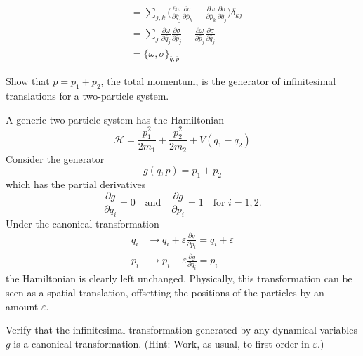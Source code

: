 \documentclass[../principles-of-quantum-mechanics.tex]{subfiles}
\begin{document}
\begin{questions}
\begin{solution}
\begin{align*}
				&= \sum_{j, k}\Big(\frac{\partial\omega}{\partial \bar{q}_j}\frac{\partial\sigma}{\partial \bar{p}_k} - \frac{\partial\omega}{\partial \bar{p}_k}\frac{\partial\sigma}{\partial \bar{q}_j}\Big)\delta_{kj} \\
				&= \sum_{j}\frac{\partial\omega}{\partial \bar{q}_j}\frac{\partial\sigma}{\partial \bar{p}_j} - \frac{\partial\omega}{\partial \bar{p}_j}\frac{\partial\sigma}{\partial \bar{q}_j} \\
				&= \{\omega, \sigma\}_{\bar{q}, \bar{p}}
			\end{align*}
		\end{solution}
		
		\question Show that $p = p_1 + p_2$, the total momentum, is the generator of infinitesimal translations for a two-particle system.
		
		\begin{solution}
			A generic two-particle system has the Hamiltonian
			\[
				\mathcal{H} = \frac{p_1^2}{2m_1} + \frac{p_2^2}{2m_2} + V(q_1 - q_2)
			\]
			Consider the generator
			\[
				g(q, p) = p_1 + p_2
			\]
			which has the partial derivatives
			\[
				\frac{\partial g}{\partial q_i} = 0 \quad\text{and}\quad \frac{\partial g}{\partial p_i} = 1 \quad\text{for }i=1,2.
			\]
			Under the canonical transformation
			\begin{align*}
				q_i &\to q_i + \varepsilon\frac{\partial g}{\partial p_i} = q_i + \varepsilon \\
				p_i &\to p_i - \varepsilon\frac{\partial g}{\partial q_i} = p_i
			\end{align*}
			the Hamiltonian is clearly left unchanged. Physically, this transformation can be seen as a spatial translation, offsetting the positions of the particles by an amount $\varepsilon$.
		\end{solution}
		
		\question Verify that the infinitesimal transformation generated by any dynamical variables $g$ is a canonical transformation. (Hint: Work, as usual, to first order in $\varepsilon$.)
		

\end{questions}
\end{document}
